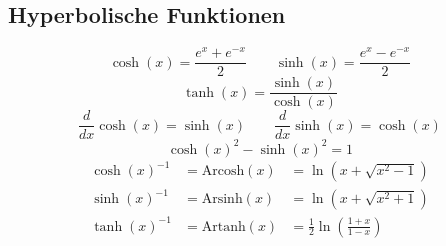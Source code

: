 \subsection{Hyperbolische Funktionen}
    $$ \cosh(x) = \frac{e^x + e^{-x}}{2} \qquad \sinh(x) = \frac{e^x - e^{-x}}{2}$$
    $$
        \tanh(x) = \frac{\sinh(x)}{\cosh(x)}
    $$
    $$
        \frac{d}{dx} \cosh(x) = \sinh(x) \qquad \frac{d}{dx} \sinh(x) = \cosh(x)
    $$
    $$
        \cosh(x)^2 - \sinh(x)^2 = 1
    $$
\begin{align*}
    \cosh(x)^{-1} &= \textrm{Arcosh}(x) &= \ln(x + \sqrt{x^2 - 1})\\
    \sinh(x)^{-1} &= \textrm{Arsinh}(x) &= \ln(x + \sqrt{x^2 + 1})\\
    \tanh(x)^{-1} &= \textrm{Artanh}(x) &= \frac{1}{2} \ln(\frac{1+x}{1-x})
\end{align*}
